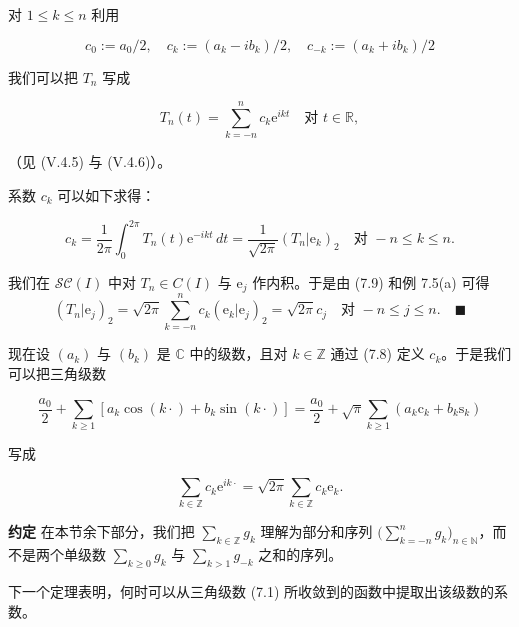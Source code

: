 对 $ 1 \le k \le n $ 利用

\begin{equation}
c_{0} := a_{0}/2 , \quad c_{k} := (a_{k} - ib_{k})/2 , \quad c_{-k} := (a_{k} + ib_{k})/2\tag{7.8}
\end{equation}

我们可以把 $ T_{n} $ 写成

\begin{equation}
T_{n}(t) = \sum_{k=-n}^{n} c_{k}\mathrm{e}^{ikt} \quad \text{对 } t \in \mathbb{R} ,\tag{7.9}
\end{equation}

（见 (V.4.5) 与 (V.4.6)）。

\begin{lemma}

系数 $ c_{k} $ 可以如下求得：

\[
c_{k} = \frac{1}{2\pi}\int_{0}^{2\pi} T_{n}(t)\mathrm{e}^{-ikt} \, dt = \frac{1}{\sqrt{2\pi}}(T_{n}|\mathrm{e}_{k})_{2} \quad \text{对 } -n \le k \le n .
\]

\proofhead
我们在 $ \mathcal{SC}(I) $ 中对 $ T_{n} \in C(I) $ 与 $ \mathrm{e}_{j} $ 作内积。于是由 (7.9) 和例 7.5(a) 可得
\[
(T_{n}|\mathrm{e}_{j})_{2} = \sqrt{2\pi}\sum_{k=-n}^{n} c_{k}(\mathrm{e}_{k}|\mathrm{e}_{j})_{2} = \sqrt{2\pi}c_{j} \quad \text{对 } -n \le j \le n .\quad\blacksquare
\]
\end{lemma}

现在设 $ (a_{k}) $ 与 $ (b_{k}) $ 是 $ \mathbb{C} $ 中的级数，且对 $ k \in \mathbb{Z} $ 通过 (7.8) 定义 $ c_{k} $。于是我们可以把三角级数

\[
\frac{a_{0}}{2} + \sum_{k \ge 1}[a_{k}\cos(k\cdot) + b_{k}\sin(k\cdot)] = \frac{a_{0}}{2} + \sqrt{\pi}\sum_{k \ge 1}(a_{k}\mathrm{c}_{k} + b_{k}\mathrm{s}_{k})
\]

写成

\begin{equation}
\sum_{k \in \mathbb{Z}} c_{k}\mathrm{e}^{ik\cdot} = \sqrt{2\pi}\sum_{k \in \mathbb{Z}} c_{k}\mathrm{e}_{k} .\tag{7.10}
\end{equation}

\textbf{约定}  在本节余下部分，我们把 $ \sum_{k \in \mathbb{Z}} g_{k} $ 理解为部分和序列 $ \big(\sum_{k=-n}^{n} g_{k}\big)_{n \in \mathbb{N}} $，而不是两个单级数 $ \sum_{k \ge 0} g_{k} $ 与 $ \sum_{k > 1} g_{-k} $ 之和的序列。

下一个定理表明，何时可以从三角级数 (7.1) 所收敛到的函数中提取出该级数的系数。


